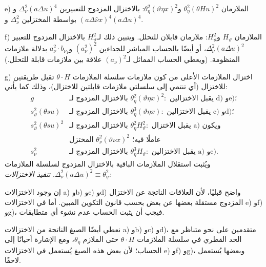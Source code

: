 \documentclass[11pt]{article}
\providecommand{\A}{\Delta}
\begin{document}
e) الملازمان $\theta_\eta^2(\theta Hu)^2$ و$\theta_\eta^2(\vartheta\eta x)^2$: بالاختزال المزدوج للتعبيرين $\A_\nu^2(a\A u)^4$ و$(a\A\widehat{\nu}x)^4$ بواسطة المختزلين $\A_\nu^2$ و$(a\A u)^4$.

f) الملازمان $H_\vartheta$ و$H_\vartheta^2$: ملازمان قابلان للتحلل. ويتبين ذلك لـ$H_\vartheta^2$ بالاختزال المزدوج للتعبير $\A_\nu^2(a\A u)^2$، أو أيضًا بالحساب المباشر للجداءين $(a_\nu^2)^2$ و$a_\nu^2\cdot b_{\nu_1}$ بدلالة ملازمات المنظومة. (ويعطي الحساب المماثل لـ$(a_\nu)^2$ علاقة بين ملازمات قابلة للتحلل.)

g) اختزال الملازمات الأعلى من كون ملازمات سلسلة الملازمات $\theta\cdot H$ تقبل طريقتين للاختزال (أي تنتمي إلى سلسلتي ملازمات قابلتين للاختزال)، وذلك كما يأتي:
\[
\begin{array}{rl}
g&\text{بالاختزال المزدوج لـ }\theta_\eta^2(\vartheta\eta x)^2:\text{ يقبل الاختزالين d) وe)؛}\\[0.3em]
s_\vartheta^2(\theta s u)&\text{بالاختزال المزدوج لـ }\theta_\eta^3(\vartheta\eta x):\text{ يقبل الاختزالين c) وd)؛}\\[0.3em]
s_\vartheta^2(\theta s u)^2&\text{بالاختزال المزدوج لـ }\theta_\eta^2H_\vartheta^2:\text{ يقبل الاختزال a) ويكون}\\
&\text{المختزل }\theta_\nu^2(\vartheta\nu x)^2\text{ عاملًا فيه؛}\\[0.3em]
s_\nu^2&\text{بالاختزال المزدوج لـ }\theta_\eta^3H_\vartheta:\text{ يقبل الاختزالين a) وc).}
\end{array}
\]
ويُثبت استقلال الملازمات الباقية بالاختزال المزدوج لسلسلة الملازمات $\A_\nu^2(a\A u)^2\equiv\theta_\eta^2$.
\noindent\emph{تنفيذ الاختزالات:}

إن وجود الاختزالات a) وb) وc) وd) واضح قبليًا، لأن العلاقات الناتجة عن الاختزال المزدوج مستقلة بعضها عن بعض بحسب قانون التكوين المبين. أما في الاختزالات e) وf) وg)، فيجب أن يثبت الحساب عدم نشوء أي متطابقات.

نعطي أيضًا الصيغ الناتجة من الاختزالات a) وb) وc) وd)، متقدمين على نحو متناظر مع الحد القطري في سلسلة الملازمات $\theta\cdot H$ حتى الملازم $\theta_\eta$، ومع الإشارة أحيانًا إلى الحساب؛ لأن بعض هذه الصيغ يُستعمل في الاختزالات e) وf) وg)، وبعضها يُستعمل لاحقًا.
\end{document}
